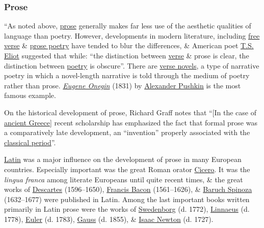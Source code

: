 \documentclass[oneside]{book}
\numberwithin{equation}{section}
\begin{document}
\subsubsection{Prose}
``As noted above, \href{https://en.wikipedia.org/wiki/Prose}{prose} generally makes far less use of the aesthetic qualities of language than poetry. However, developments in modern literature, including \href{https://en.wikipedia.org/wiki/Free_verse}{free verse} \& \href{https://en.wikipedia.org/wiki/Prose_poetry}{prose poetry} have tended to blur the differences, \& American poet \href{https://en.wikipedia.org/wiki/T.S._Eliot}{T.S. Eliot} suggested that while: ``the distinction between \href{https://en.wikipedia.org/wiki/Verse_(poetry)}{verse} \& prose is clear, the distinction between \href{https://en.wikipedia.org/wiki/Poetry}{poetry} is obscure''. There are \href{https://en.wikipedia.org/wiki/Verse_novel}{verse novels}, a type of narrative poetry in which a novel-length narrative is told through the medium of poetry rather than prose. \href{https://en.wikipedia.org/wiki/Eugene_Onegin}{\textit{Eugene Onegin}} (1831) by \href{https://en.wikipedia.org/wiki/Alexander_Pushkin}{Alexander Pushkin} is the most famous example.

On the historical development of prose, Richard Graff notes that ``[In the case of \href{https://en.wikipedia.org/wiki/Ancient_Greece}{ancient Greece}] recent scholarship has emphasized the fact that formal prose was a comparatively late development, an ``invention'' properly associated with the \href{https://en.wikipedia.org/wiki/Classical_antiquity}{classical period}''.

\href{https://en.wikipedia.org/wiki/Latin}{Latin} was a major influence on the development of prose in many European countries. Especially important was the great Roman orator \href{https://en.wikipedia.org/wiki/Cicero}{Cicero}. It was the \textit{lingua franca} among literate Europeans until quite recent times, \& the great works of \href{https://en.wikipedia.org/wiki/Descartes}{Descartes} (1596--1650), \href{https://en.wikipedia.org/wiki/Francis_Bacon}{Francis Bacon} (1561--1626), \& \href{https://en.wikipedia.org/wiki/Baruch_Spinoza}{Baruch Spinoza} (1632--1677) were published in Latin. Among the last important books written primarily in Latin prose were the works of \href{https://en.wikipedia.org/wiki/Emanuel_Swedenborg}{Swedenborg} (d. 1772), \href{https://en.wikipedia.org/wiki/Carl_Linnaeus}{Linnaeus} (d. 1778), \href{https://en.wikipedia.org/wiki/Leonhard_Euler}{Euler} (d. 1783), \href{https://en.wikipedia.org/wiki/Carl_Friedrich_Gauss}{Gauss} (d. 1855), \& \href{https://en.wikipedia.org/wiki/Isaac_Newton}{Isaac Newton} (d. 1727).
\end{document}
